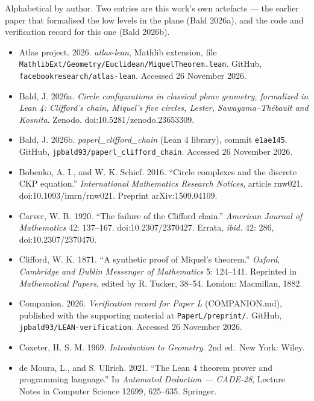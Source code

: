 \documentclass[11pt]{article}
\providecommand{\tightlist}{\setlength{\itemsep}{0pt}\setlength{\parskip}{0pt}}
\theoremstyle{definition}
\theoremstyle{remark}
\begin{document}
Alphabetical by author. Two entries are this work's own artefacts --- the earlier paper that formalised the
low levels in the plane (Bald 2026a), and the code and verification record for this one (Bald 2026b).

\begin{itemize}
\tightlist
\item
  Atlas project. 2026. \emph{atlas-lean}, Mathlib extension, file
  \texttt{MathlibExt/\allowbreak Geometry/\allowbreak Euclidean/\allowbreak MiquelTheorem.\allowbreak lean}. GitHub, \texttt{facebookresearch/\allowbreak atlas-lean}. Accessed 26
  November 2026.
\item
  Bald, J. 2026a. \emph{Circle configurations in classical plane geometry, formalized in Lean 4: Clifford's
  chain, Miquel's five circles, Lester, Sawayama--Thébault and Kosnita}. Zenodo.
  doi:10.5281/zenodo.23653309.
\item
  Bald, J. 2026b. \emph{paperl\_clifford\_chain} (Lean 4 library), commit \texttt{e1ae145}. GitHub,
  \texttt{jpbald93/\allowbreak paperl\_\allowbreak clifford\_\allowbreak chain}. Accessed 26 November 2026.
\item
  Bobenko, A. I., and W. K. Schief. 2016. ``Circle complexes and the discrete CKP equation.''
  \emph{International Mathematics Research Notices}, article rnw021. doi:10.1093/imrn/rnw021. Preprint
  arXiv:1509.04109.
\item
  Carver, W. B. 1920. ``The failure of the Clifford chain.'' \emph{American Journal of Mathematics} 42:
  137--167. doi:10.2307/2370427. Errata, \emph{ibid.} 42: 286, doi:10.2307/2370470.
\item
  Clifford, W. K. 1871. ``A synthetic proof of Miquel's theorem.'' \emph{Oxford, Cambridge and Dublin Messenger
  of Mathematics} 5: 124--141. Reprinted in \emph{Mathematical Papers}, edited by R. Tucker, 38--54. London:
  Macmillan, 1882.
\item
  Companion. 2026. \emph{Verification record for Paper L} (COMPANION.md), published with the supporting
  material at \texttt{PaperL/\allowbreak preprint/\allowbreak }. GitHub, \texttt{jpbald93/\allowbreak LEAN-verification}. Accessed 26 November 2026.
\item
  Coxeter, H. S. M. 1969. \emph{Introduction to Geometry}. 2nd ed.~New York: Wiley.
\item
  de Moura, L., and S. Ullrich. 2021. ``The Lean 4 theorem prover and programming language.'' In
  \emph{Automated Deduction --- CADE-28}, Lecture Notes in Computer Science 12699, 625--635. Springer.

\end{itemize}
\end{document}
